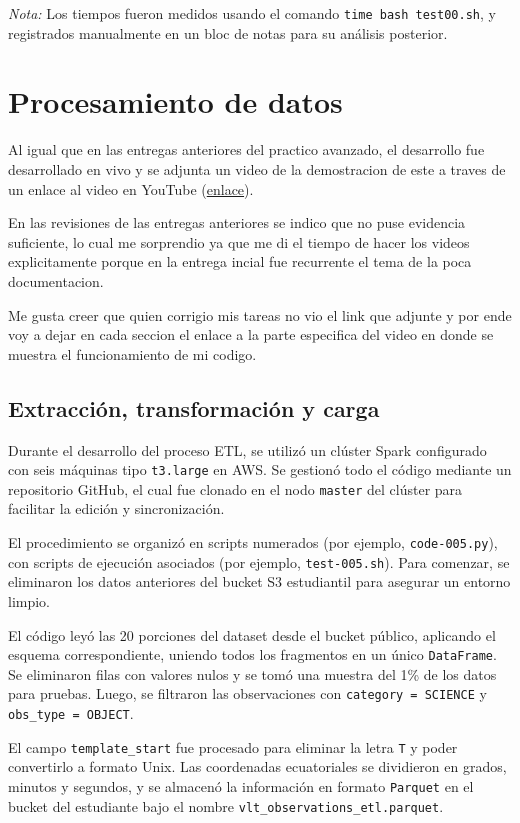 \documentclass[12pt,letterpaper,twoside]{article}
\begin{document}
\textit{Nota:} Los tiempos fueron medidos usando el comando \texttt{time bash test00.sh}, y registrados manualmente en un bloc de notas para su análisis posterior.

\section{Procesamiento de datos}

Al igual que en las entregas anteriores del practico avanzado, el desarrollo fue desarrollado en vivo y se adjunta un video de la demostracion de este a traves de un enlace al video en YouTube ({\color{blue}\href{https://www.youtube.com/watch?v=GdrpnyFULTI}{enlace}}).

En las revisiones de las entregas anteriores se indico que no puse evidencia suficiente, lo cual me sorprendio ya que me di el tiempo de hacer los videos explicitamente porque en la entrega incial fue recurrente el tema de la poca documentacion.

Me gusta creer que quien corrigio mis tareas no vio el link que adjunte y por ende voy a dejar en cada seccion el enlace a la parte especifica del video en donde se muestra el funcionamiento de mi codigo.

\subsection{Extracción, transformación y carga}

Durante el desarrollo del proceso ETL, se utilizó un clúster Spark configurado con seis máquinas tipo \texttt{t3.large} en AWS. Se gestionó todo el código mediante un repositorio GitHub, el cual fue clonado en el nodo \texttt{master} del clúster para facilitar la edición y sincronización.

El procedimiento se organizó en scripts numerados (por ejemplo, \texttt{code-005.py}), con scripts de ejecución asociados (por ejemplo, \texttt{test-005.sh}). Para comenzar, se eliminaron los datos anteriores del bucket S3 estudiantil para asegurar un entorno limpio.

El código leyó las 20 porciones del dataset desde el bucket público, aplicando el esquema correspondiente, uniendo todos los fragmentos en un único \texttt{DataFrame}. Se eliminaron filas con valores nulos y se tomó una muestra del 1\% de los datos para pruebas. Luego, se filtraron las observaciones con \texttt{category = SCIENCE} y \texttt{obs\_type = OBJECT}.

El campo \texttt{template\_start} fue procesado para eliminar la letra \texttt{T} y poder convertirlo a formato Unix. Las coordenadas ecuatoriales se dividieron en grados, minutos y segundos, y se almacenó la información en formato \texttt{Parquet} en el bucket del estudiante bajo el nombre \texttt{vlt\_observations\_etl.parquet}.
\end{document}
